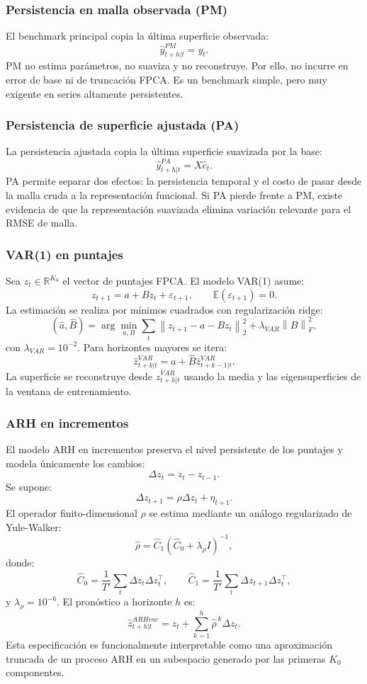 \documentclass[a4paper,11pt]{article}
\newcommand{\R}{\mathbb{R}}
\newcommand{\E}{\mathbb{E}}
\newcommand{\norm}[1]{\left\lVert #1 \right\rVert}
\begin{document}
\subsubsection{Persistencia en malla observada (PM)}

El benchmark principal copia la última superficie observada:
\[
  \widehat y_{t+h|t}^{PM}=y_t.
\]
PM no estima parámetros, no suaviza y no reconstruye. Por ello, no incurre en error de base ni de truncación FPCA. Es un benchmark simple, pero muy exigente en series altamente persistentes.

\subsubsection{Persistencia de superficie ajustada (PA)}

La persistencia ajustada copia la última superficie suavizada por la base:
\[
  \widehat y_{t+h|t}^{PA}=X\widehat c_t.
\]
PA permite separar dos efectos: la persistencia temporal y el costo de pasar desde la malla cruda a la representación funcional. Si PA pierde frente a PM, existe evidencia de que la representación suavizada elimina variación relevante para el RMSE de malla.

\subsubsection{VAR(1) en puntajes}

Sea \(z_t\in\R^{K_0}\) el vector de puntajes FPCA. El modelo VAR(1) asume:
\[
  z_{t+1}=a+Bz_t+\varepsilon_{t+1},
  \qquad
  \E(\varepsilon_{t+1})=0.
\]
La estimación se realiza por mínimos cuadrados con regularización ridge:
\[
  (\widehat a,\widehat B)
  =
  \arg\min_{a,B}
  \sum_t \norm{z_{t+1}-a-Bz_t}_2^2
  +\lambda_{VAR}\norm{B}_F^2,
\]
con \(\lambda_{VAR}=10^{-2}\). Para horizontes mayores se itera:
\[
  \widehat z_{t+k|t}^{VAR}
  =
  \widehat a+\widehat B\widehat z_{t+k-1|t}^{VAR}.
\]
La superficie se reconstruye desde \(\widehat z_{t+h|t}^{VAR}\) usando la media y las eigensuperficies de la ventana de entrenamiento.

\subsubsection{ARH en incrementos}

El modelo ARH en incrementos preserva el nivel persistente de los puntajes y modela únicamente los cambios:
\[
  \Delta z_t=z_t-z_{t-1}.
\]
Se supone:
\[
  \Delta z_{t+1}=\rho \Delta z_t+\eta_{t+1}.
\]
El operador finito-dimensional \(\rho\) se estima mediante un análogo regularizado de Yule-Walker:
\[
  \widehat\rho=\widehat C_1(\widehat C_0+\lambda_\rho I)^{-1},
\]
donde:
\[
  \widehat C_0=\frac{1}{T'}\sum_t \Delta z_t\Delta z_t^\top,
  \qquad
  \widehat C_1=\frac{1}{T'}\sum_t \Delta z_{t+1}\Delta z_t^\top,
\]
y \(\lambda_\rho=10^{-6}\). El pronóstico a horizonte \(h\) es:
\[
  \widehat z_{t+h|t}^{ARHinc}
  =
  z_t+\sum_{k=1}^{h}\widehat\rho^{\,k}\Delta z_t.
\]
Esta especificación es funcionalmente interpretable como una aproximación truncada de un proceso ARH en un subespacio generado por las primeras \(K_0\) componentes.
\end{document}

